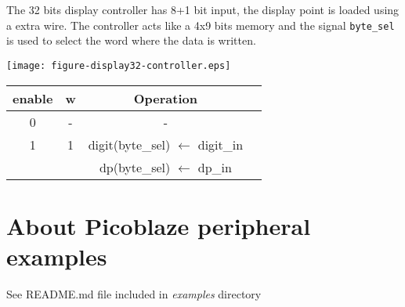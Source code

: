 \documentclass[10pt,a4paper,onecolumn]{article}
\begin{document}
The 32 bits display controller has 8+1 bit input, the display point is loaded
using a extra wire. The controller acts like a 4x9 bits memory and the signal 
\texttt{byte\_sel} is used to select the word where the data is written.


\begin{center}

  \texttt{[image: figure-display32-controller.eps]}
  \label{fig:unit-display32}
\bigskip 
  \centering
  \begin{tabular}{|c|c|c|c|}
  \hline 
  enable & w &  Operation \\ 
  \hline 
  \hline 
  0 & - & - \\ 
  \hline 
  1 & 1 &  digit(byte\_sel)  ${\leftarrow}$ digit\_in \\ 
    &   &  dp(byte\_sel) ${\leftarrow}$ dp\_in \\
  \hline 
  \end{tabular}
  
    
\end{center}

 

\section*{About Picoblaze peripheral examples}

See README.md file included in \emph{examples} directory 
\end{document}
